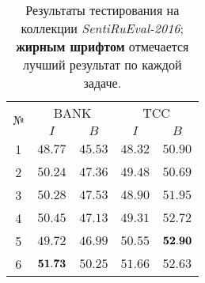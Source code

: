 \begin{table}[ht!]
\centering
\caption{Результаты тестирования на коллекции {\it SentiRuEval-2016};
        {\bf жирным шрифтом} отмечается лучший результат по каждой задаче.
        }
\label{table:results2016}
\begin{tabular}{ccccc}
\hline
\multicolumn{1}{c|}{\multirow{2}{*}{№}} & \multicolumn{2}{c|}{BANK} & \multicolumn{2}{c}{TCC}\\ \cline{2-5}
\multicolumn{1}{c|}{}                   & \multicolumn{1}{c|}{$I$} & \multicolumn{1}{c|}{$B$} & \multicolumn{1}{c|}{$I$} & $B$             \\ \hline
1                                       & ${48.77}$                              & $45.53$                              & $48.32$                             & $50.90$                    \\
2                                       & ${50.24}$                              & $47.36$                              & $49.48$                             & $50.69$                    \\
3                                       & ${50.28}$                              & $47.53$                              & $48.90$                             & $51.95$                    \\
4                                       & ${50.45}$                              & $47.13$                              & $49.31$                             & $52.72$                    \\
5                                       & ${49.72}$                              & $46.99$                              & $50.55$                             & $\bf{52.90}$               \\
6                                       & ${\bf 51.73}$                          & $50.25$                              & $51.66$                             & $52.63$                    \\ \hline
\end{tabular}
\end{table}
